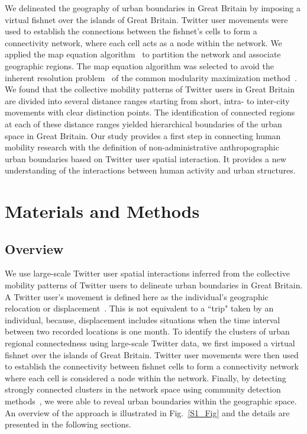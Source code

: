 \documentclass[10pt,letterpaper]{article}
\begin{document}
We delineated the geography of urban boundaries in Great Britain by imposing a virtual fishnet over the islands of Great Britain.
Twitter user movements were used to establish the connections between the fishnet's cells to form a connectivity network, where each cell acts as a node within the network.
We applied the map equation algorithm~\cite{domenico2015} to partition the network and associate geographic regions.
The map equation algorithm was selected to avoid the inherent resolution problem~\cite{fortunato2007} of the common modularity maximization method~\cite{newman2006}. 
We found that the collective mobility patterns of Twitter users in Great Britain are divided into several distance ranges starting from short, intra- to inter-city movements with clear distinction points. 
The identification of connected regions at each of these distance ranges yielded hierarchical boundaries of the urban space in Great Britain.
Our study provides a first step in connecting human mobility research with the definition of non-administrative anthropographic urban boundaries based on Twitter user spatial interaction. 
It provides a new understanding of the interactions between human activity and urban structures. 

\section*{Materials and Methods}
\subsection*{Overview}
We use large-scale Twitter user spatial interactions inferred from the collective mobility patterns of Twitter users to delineate urban boundaries in Great Britain.
A Twitter user's movement is defined here as the individual's geographic relocation or displacement~\cite{gonzalez2008}.
This is not equivalent to a ``trip" taken by an individual, because, displacement includes situations when the time interval between two recorded locations is one month.
To identify the clusters of urban regional connectedness using large-scale Twitter data, we first imposed a virtual fishnet over the islands of Great Britain.
Twitter user movements were then used to establish the connectivity between fishnet cells to form a connectivity network where each cell is considered a node within the network. 
Finally, by detecting strongly connected clusters in the network space using community detection methods~\cite{coscia2011}, we were able to reveal urban boundaries within the geographic space. 
An overview of the approach is illustrated in Fig.~\ref{S1_Fig} and the details are presented in the following sections. 
\end{document}
